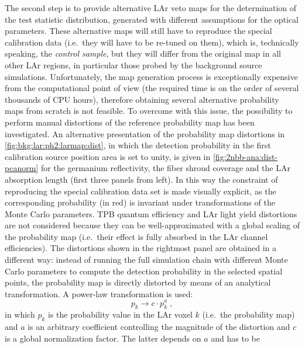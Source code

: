 \begin{description}[wide]
    \newpar
    The second step is to provide alternative LAr veto maps for the determination of the
    test statistic distribution, generated with different assumptions for the optical
    parameters. These alternative maps will still have to reproduce the special
    calibration data (i.e.~they will have to be re-tuned on them), which is, technically
    speaking, the \emph{control sample}, but they will differ from the original map in all
    other LAr regions, in particular those probed by the background source simulations.
    Unfortunately, the map generation process is exceptionally expensive from
    the computational point of view (the required time is on the order of several
    thousands of CPU hours), therefore obtaining several alternative probability maps from
    scratch is not feasible. To overcome with this issue, the possibility to perform
    manual distortions of the reference probability map has been investigated.
    \newpar
    An alternative presentation of the probability map distortions in
    \cref{fig:bkg:lar:ph2:larmap:dist}, in which the detection probability in the first
    calibration source position area is set to unity, is given in
    \cref{fig:2nbb-ana:dist-pcanorm} for the germanium reflectivity, the fiber shroud
    coverage and the LAr absorption length (first three panels from left). In this way the
    constraint of reproducing the special calibration data set is made visually explicit,
    as the corresponding probability (in red) is invariant under transformations of the
    Monte Carlo parameters. TPB quantum efficiency and LAr light yield distortions are not
    considered because they can be well-approximated with a global scaling of the
    probability map (i.e.~their effect is fully absorbed in the LAr channel efficiencies).
    The distortions shown in the rightmost panel are obtained in a different way: instead
    of running the full simulation chain with different Monte Carlo parameters to compute
    the detection probability in the selected spatial points, the probability map is
    directly distorted by means of an analytical transformation. A power-law
    transformation is used:
    \begin{equation}\label{eq:2nbb-ana:powerlaw}
      p_k \rightarrow c \cdot p_k^a \;,
    \end{equation}
    in which $p_k$ is the probability value in the LAr voxel $k$ (i.e.~the probability
    map) and $a$ is an arbitrary coefficient controlling the magnitude of the distortion
    and $c$ is a global normalization factor. The latter depends on $a$ and has to be

\end{description}
